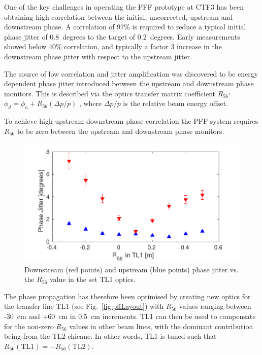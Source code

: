 \documentclass[%
 reprint,
 amsmath,amssymb,
 prl,
]{revtex4-1}
\begin{document}
One of the key challenges in operating the PFF prototype at CTF3 has been 
obtaining high correlation between the initial, uncorrected, upstream and 
downstream phase. A correlation of 97\% is required to reduce a typical initial 
phase jitter of \(0.8\)~degrees to the target of \(0.2\)~degrees. Early 
measurements showed below 40\% correlation, and typically a factor 3 increase in the downstream phase jitter with respect to the upstream jitter.

The source of low correlation and jitter amplification was discovered to be energy dependent phase 
jitter introduced between the upstream and downstream phase monitors. This is 
described via the optics transfer matrix coefficient \(R_{56}\):
\(\phi_d = \phi_u + R_{56}(\Delta p / p)\)
, where \(\Delta p / p\) is the relative beam energy offset.


To achieve high upstream-downstream phase correlation the PFF system requires \(R_{56}\) to be zero between the upstream and 
downstream phase monitors.

\begin{figure}
	\includegraphics[width=\columnwidth]{figs/r56Scan}%
	\caption{\label{fig:r56Scan}Downstream (red points) and upstream (blue 
		points) phase jitter vs. the \(R_{56}\) value in the set TL1 optics. 
		}
\end{figure}

The phase propagation has therefore been optimised by creating new optics for the transfer line TL1 (see Fig.~\ref{fig:pffLayout}) with \(R_{56}\) values ranging between -30~cm and +60~cm in 0.5~cm increments. TL1 can then be used to compensate for the non-zero \(R_{56}\) values in other beam lines, with the dominant contribution being from the TL2 chicane. In other words, TL1 is tuned such that \(R_{56}(\mathrm{TL1}) = -R_{56}(\mathrm{TL2})\).
\end{document}
